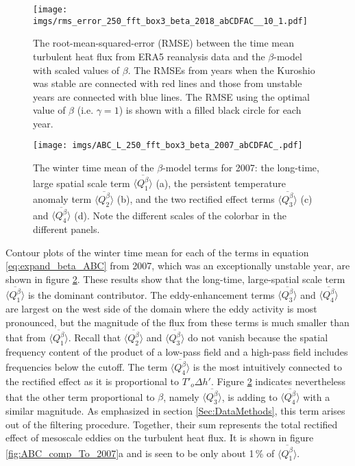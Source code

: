 \begin{figure}[tb]
    \centering
    \texttt{[image: imgs/rms\_error\_250\_fft\_box3\_beta\_2018\_abCDFAC\_\_10\_1.pdf]}
    \caption{The root-mean-squared-error (RMSE) between the time mean turbulent heat flux from ERA5 reanalysis data and the $\beta$-model with scaled values of $\beta$. The RMSEs from years when the Kuroshio was stable are connected with red lines and those from unstable years are connected with blue lines. The RMSE using the optimal value of $\beta$ (i.e. $\gamma=1$) is shown with a filled black circle for each year.}
    \label{fig:RMSE_beta}
\end{figure}

\begin{figure}[tb]
    \centering
    \texttt{[image: imgs/ABC\_L\_250\_fft\_box3\_beta\_2007\_abCDFAC\_.pdf]}
    \caption{The winter time mean of the $\beta$-model terms for 2007: the long-time, large spatial scale term $\langle\overline{Q^\beta_1}\rangle$ (a), the persistent temperature anomaly term $\langle\overline{Q^\beta_2}\rangle$ (b), and the two rectified effect terms $\langle\overline{Q^\beta_3}\rangle$ (c) and $\langle\overline{Q^\beta_4}\rangle$ (d). Note the different scales of the colorbar in the different panels.}
    \label{fig:ABC_2007}
\end{figure}

Contour plots of the winter time mean for each of the terms in equation \ref{eq:expand_beta_ABC} from 2007, which was an exceptionally unstable year, are shown in figure \ref{fig:ABC_2007}. These results show that the long-time, large-spatial scale term $\langle\overline{Q^\beta_1}\rangle$ is the dominant contributor. The eddy-enhancement terms $\langle\overline{Q^\beta_3}\rangle$ and $\langle\overline{Q^\beta_4}\rangle$ are largest on the west side of the domain where the eddy activity is most pronounced, but the magnitude of the flux from these terms is much smaller than that from $\langle\overline{Q^\beta_1}\rangle$. Recall that $\langle\overline{Q^\beta_2}\rangle$ and $\langle\overline{Q^\beta_3}\rangle$ do not vanish because the spatial frequency content of the product of a low-pass field and a high-pass field includes frequencies below the cutoff. The term $\langle\overline{Q^\beta_4}\rangle$ is the most intuitively connected to the rectified effect as it is proportional to $T'_o \Delta h'$. Figure \ref{fig:ABC_2007} indicates nevertheless that the other term proportional to $\beta$, namely $\langle\overline{Q^\beta_3}\rangle$, is adding to $\langle\overline{Q^\beta_4}\rangle$ with a similar magnitude. As emphasized in section \ref{Sec:DataMethods}, this term arises out of the filtering procedure. Together, their sum represents the total rectified effect of mesoscale eddies on the turbulent heat flux. It is shown in figure \ref{fig:ABC_comp_To_2007}a and is seen to be only about 1\,\% of $\langle\overline{Q^\beta_1}\rangle$.\par

